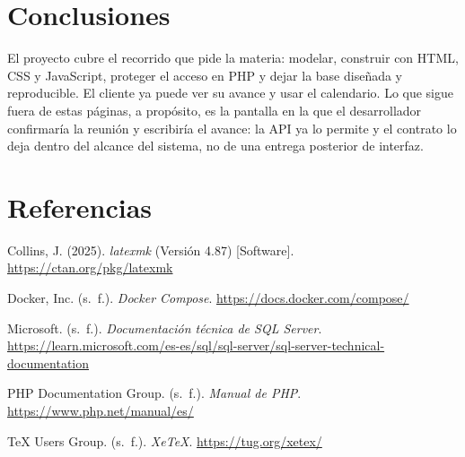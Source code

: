 \section{Conclusiones}

El proyecto cubre el recorrido que pide la materia: modelar, construir con
HTML, CSS y JavaScript, proteger el acceso en PHP y dejar la base diseñada y
reproducible. El cliente ya puede ver su avance y usar el calendario. Lo que
sigue fuera de estas páginas, a propósito, es la pantalla en la que el
desarrollador confirmaría la reunión y escribiría el avance: la API ya lo
permite y el contrato lo deja dentro del alcance del sistema, no de una
entrega posterior de interfaz.

\section{Referencias}

\begin{list}{}{%
  \setlength{\leftmargin}{1.27cm}%
  \setlength{\itemindent}{-1.27cm}%
  \setlength{\itemsep}{0.7em}%
  \setlength{\parsep}{0pt}%
  \setlength{\topsep}{0.4em}%
}
  \item Collins, J. (2025). \emph{latexmk} (Versión 4.87) [Software]. \url{https://ctan.org/pkg/latexmk}

  \item Docker, Inc. (s.~f.). \emph{Docker Compose}. \url{https://docs.docker.com/compose/}

  \item Microsoft. (s.~f.). \emph{Documentación técnica de SQL Server}. \url{https://learn.microsoft.com/es-es/sql/sql-server/sql-server-technical-documentation}

  \item PHP Documentation Group. (s.~f.). \emph{Manual de PHP}. \url{https://www.php.net/manual/es/}

  \item TeX Users Group. (s.~f.). \emph{XeTeX}. \url{https://tug.org/xetex/}
\end{list}


